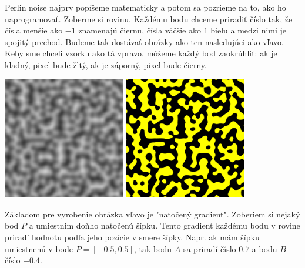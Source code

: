 Perlin noise najprv popíšeme matematicky a potom sa pozrieme na to, ako ho naprogramovať.
Zoberme si rovinu. Každému bodu chceme priradiť číslo tak, že čísla menšie ako $-1$ znamenajú
čiernu, čísla väčšie ako $1$ bielu a medzi nimi je spojitý prechod. Budeme tak dostávať 
obrázky ako ten nasledujúci ako vľavo. Keby sme chceli vzorku ako tá vpravo, môžeme každý bod zaokrúhliť: ak je
kladný, pixel bude žltý, ak je záporný, pixel bude čierny.\\


\centerline{
  \includegraphics[width=0.4\textwidth]{data/perlin_single.png}
  \hskip 1cm
  \includegraphics[width=0.4\textwidth]{data/perlin_single_crisp.png}
}


Základom pre vyrobenie obrázka vľavo je "natočený gradient". Zoberiem si nejaký bod $P$  a 
umiestnim doňho natočenú šípku. Tento gradient každému bodu v rovine 
priradí hodnotu podľa jeho pozície 
v smere šípky. Napr. ak mám šípku umiestnenú v bode $P=[-0.5,0.5]$, tak bodu $A$ sa
priradí číslo $0.7$ a bodu $B$ číslo $-0.4$.



